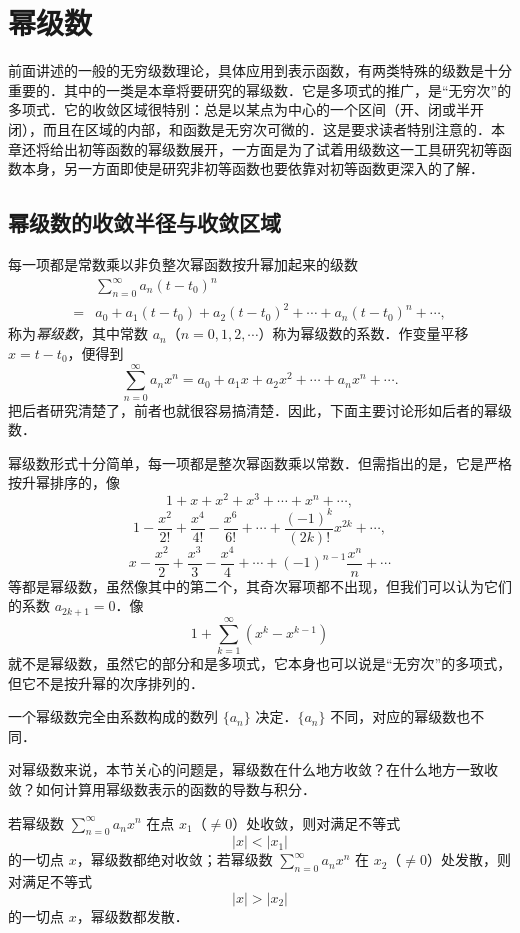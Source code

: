 \chapter{幂级数}

前面讲述的一般的无穷级数理论，具体应用到表示函数，有两类特殊的级数是十分重要的．其中的一类是本章将要研究的幂级数．它是多项式的推广，是``无穷次''的多项式．它的收敛区域很特别：总是以某点为中心的一个区间（开、闭或半开闭），而且在区域的内部，和函数是无穷次可微的．这是要求读者特别注意的．本章还将给出初等函数的幂级数展开，一方面是为了试着用级数这一工具研究初等函数本身，另一方面即使是研究非初等函数也要依靠对初等函数更深入的了解．

\section{幂级数的收敛半径与收敛区域}

每一项都是常数乘以非负整次幂函数按升幂加起来的级数
\[
\begin{aligned}
&\sum_{n=0}^{\infty}a_{n}(t-t_{0})^{n}\\
={}&a_{0}+a_{1}(t-t_{0})+a_{2}(t-t_{0})^{2}+\cdots+a_{n}(t-t_{0})^{n}+\cdots,
\end{aligned}
\]
称为\emph{幂级数}，其中常数 $a_{n}$（$n=0,1,2,\cdots$）称为幂级数的系数．作变量平移 $x=t-t_{0}$，便得到
\[
\sum_{n=0}^{\infty}a_{n}x^{n}=a_{0}+a_{1}x+a_{2}x^{2}+\cdots+a_{n}x^{n}+\cdots.
\]
把后者研究清楚了，前者也就很容易搞清楚．因此，下面主要讨论形如后者的幂级数．

幂级数形式十分简单，每一项都是整次幂函数乘以常数．但需指出的是，它是严格按升幂排序的，像
\[
1+x+x^{2}+x^{3}+\cdots+x^{n}+\cdots,
\]
\[
1-\frac{x^{2}}{2!}+\frac{x^{4}}{4!}-\frac{x^{6}}{6!}+\cdots+\frac{(-1)^{k}}{(2k)!}x^{2k}+\cdots,
\]
\[
x-\frac{x^{2}}{2}+\frac{x^{3}}{3}-\frac{x^{4}}{4}+\cdots+(-1)^{n-1}\frac{x^{n}}{n}+\cdots
\]
等都是幂级数，虽然像其中的第二个，其奇次幂项都不出现，但我们可以认为它们的系数 $a_{2k+1}=0$．像
\[
1+\sum_{k=1}^{\infty}\left(x^{k}-x^{k-1}\right)
\]
就不是幂级数，虽然它的部分和是多项式，它本身也可以说是``无穷次''的多项式，但它不是按升幂的次序排列的．

一个幂级数完全由系数构成的数列 $\{a_{n}\}$ 决定．$\{a_{n}\}$ 不同，对应的幂级数也不同．

对幂级数来说，本节关心的问题是，幂级数在什么地方收敛？在什么地方一致收敛？如何计算用幂级数表示的函数的导数与积分．

\begin{theorem}[阿贝尔第一定理]\label{thm:13-1}
若幂级数 $\displaystyle\sum_{n=0}^{\infty}a_{n}x^{n}$ 在点 $x_{1}$（$\neq 0$）处收敛，则对满足不等式
\[
\left|x\right|<\left|x_{1}\right|
\]
的一切点 $x$，幂级数都绝对收敛；若幂级数 $\displaystyle\sum_{n=0}^{\infty}a_{n}x^{n}$ 在 $x_{2}$（$\neq 0$）处发散，则对满足不等式
\[
\left|x\right|>\left|x_{2}\right|
\]
的一切点 $x$，幂级数都发散．
\end{theorem}

